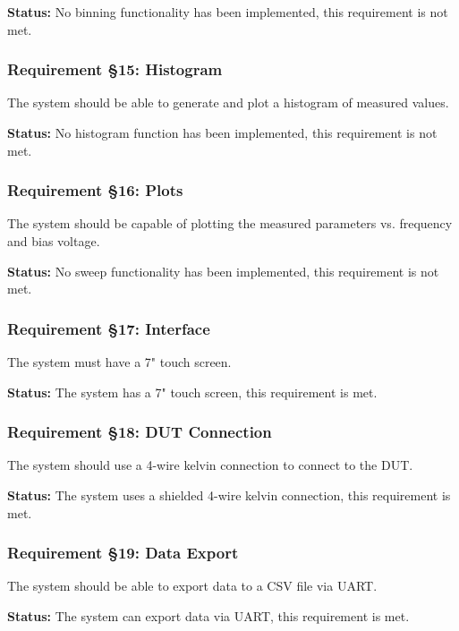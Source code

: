 \textbf{Status:} No binning functionality has been implemented, this requirement is not met.
\nl
\nl

\subsubsection*{Requirement §15: Histogram}
The system should be able to generate and plot a histogram of measured values.

\textbf{Status:} No histogram function has been implemented, this requirement is not met.
\nl
\nl

\subsubsection*{Requirement §16: Plots}
The system should be capable of plotting the measured parameters vs. frequency and bias voltage.

\textbf{Status:} No sweep functionality has been implemented, this requirement is not met.
\nl
\nl

\subsubsection*{Requirement §17: Interface}
The system must have a 7" touch screen.

\textbf{Status:} The system has a 7" touch screen, this requirement is met.
\nl
\nl

\subsubsection*{Requirement §18: DUT Connection}
The system should use a 4-wire kelvin connection to connect to the DUT.

\textbf{Status:} The system uses a shielded 4-wire kelvin connection, this requirement is met.
\nl
\nl

\subsubsection*{Requirement §19: Data Export}
The system should be able to export data to a CSV file via UART.

\textbf{Status:} The system can export data via UART, this requirement is met.
\nl
\nl

